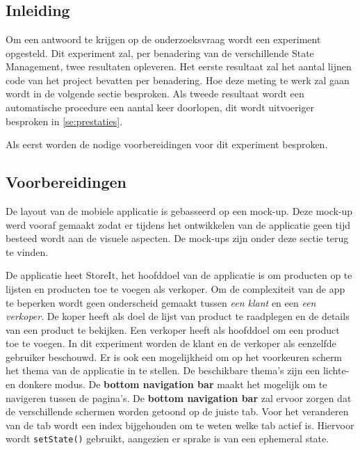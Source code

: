 
\chapter{}
\label{ch:methodologie}

\section{Inleiding}
Om een antwoord te krijgen op de onderzoeksvraag wordt een experiment opgesteld. Dit experiment zal, per benadering van de verschillende State Management, twee resultaten opleveren. Het eerste resultaat zal het aantal lijnen code van het project bevatten per benadering. Hoe deze meting te werk zal gaan wordt in de volgende sectie besproken. Als tweede resultaat wordt een automatische procedure een aantal keer doorlopen, dit wordt uitvoeriger besproken in \ref{se:prestaties}.

Als eerst worden de nodige voorbereidingen voor dit experiment besproken.

\section{Voorbereidingen}
De layout van de mobiele applicatie is gebasseerd op een mock-up. Deze mock-up werd vooraf gemaakt zodat er tijdens het ontwikkelen van de applicatie geen tijd besteed wordt aan de visuele aspecten. De mock-ups zijn onder deze sectie terug te vinden.

De applicatie heet StoreIt, het hoofddoel van de applicatie is om producten op te lijsten en producten toe te voegen als verkoper. Om de complexiteit van de app te beperken wordt geen onderscheid gemaakt tussen \textit{een klant} en een \textit{een verkoper}. De koper heeft als doel de lijst van product te raadplegen en de details van een product te bekijken. Een verkoper heeft als hoofddoel om een product toe te voegen. In dit experiment worden de klant en de verkoper als eenzelfde gebruiker beschouwd. Er is ook een mogelijkheid om op het voorkeuren scherm het thema van de applicatie in te stellen. De beschikbare thema's zijn een lichte- en donkere modus.
De \textbf{bottom navigation bar} maakt het mogelijk om te navigeren tussen de pagina's. De \textbf{bottom navigation bar} zal ervoor zorgen dat de verschillende schermen worden getoond op de juiste tab. Voor het veranderen van de tab wordt een index bijgehouden om te weten welke tab actief is. Hiervoor wordt \verb|setState()| gebruikt, aangezien er sprake is van een ephemeral state.

